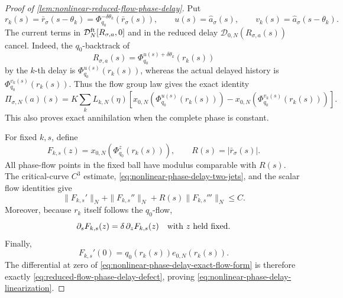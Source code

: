 \begin{proof}[Proof of
\cref{lem:nonlinear-reduced-flow-phase-delay}]
Put
\[
 r_k(s)=\bar r_\sigma(s-\theta_k)
       =\Phi_{q_0}^{-\delta\theta_k}(\bar r_\sigma(s)),
 \qquad
 u(s)=\widehat a_\sigma(s),\qquad
 v_k(s)=\widehat a_\sigma(s-\theta_k).
\]
The current terms in
\(\mathcal D_N^{\rm ft}[R_{\sigma,a},0]\) and in the reduced delay
\(\mathcal D_{0,N}(R_{\sigma,a}(s))\) cancel.  Indeed, the
\(q_0\)-backtrack of
\[
 R_{\sigma,a}(s)
 =\Phi_{q_0}^{u(s)+\delta\theta_k}(r_k(s))
\]
by the \(k\)-th delay is
\(\Phi_{q_0}^{u(s)}(r_k(s))\), whereas the actual delayed history is
\(\Phi_{q_0}^{v_k(s)}(r_k(s))\).  Thus the flow group law gives the exact
identity
\begin{equation}
 \Pi_{\sigma,N}(a)(s)
 =K\sum_kL_{k,N}(\eta)
 \left[
  x_{0,N}\!\left(\Phi_{q_0}^{u(s)}(r_k(s))\right)
 -x_{0,N}\!\left(\Phi_{q_0}^{v_k(s)}(r_k(s))\right)
 \right].                                        \label{eq:nonlinear-phase-delay-exact-flow-form}
\end{equation}
This also proves exact annihilation when the complete phase is constant.

For fixed \(k,s\), define
\[
 F_{k,s}(z)=x_{0,N}\!\left(\Phi_{q_0}^{z}(r_k(s))\right),
 \qquad R(s)=|\bar r_\sigma(s)|.
\]
All phase-flow points in the fixed ball have modulus comparable with
\(R(s)\).  The critical-curve \(C^3\) estimate,
\cref{eq:nonlinear-phase-delay-two-jets}, and the scalar flow identities
give
\begin{equation}
 \|F_{k,s}'\|_N+\|F_{k,s}''\|_N
       +R(s)\|F_{k,s}'''\|_N\le C.                \label{eq:nonlinear-phase-delay-flow-jets}
\end{equation}
Moreover, because \(r_k\) itself follows the \(q_0\)-flow,
\begin{equation}
 \partial_sF_{k,s}(z)=\delta\,\partial_zF_{k,s}(z)
 \quad\hbox{with \(z\) held fixed}.               \label{eq:nonlinear-phase-delay-flow-transport}
\end{equation}
Finally,
\[
 F_{k,s}'(0)=q_0(r_k(s))e_{0,N}(r_k(s)).
\]
The differential at zero of
\cref{eq:nonlinear-phase-delay-exact-flow-form} is therefore exactly
\cref{eq:reduced-flow-phase-delay-defect}, proving
\cref{eq:nonlinear-phase-delay-linearization}.


\end{proof}

